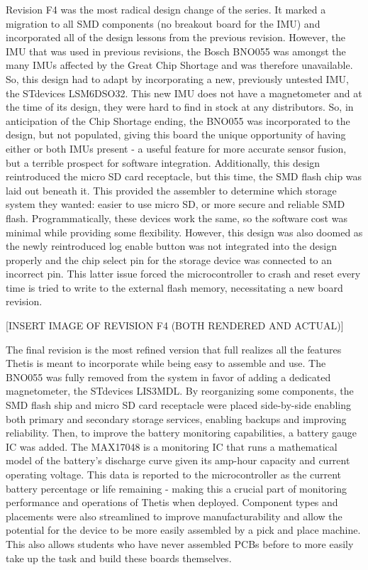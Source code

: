 Revision F4 was the most radical design change of the series.
It marked a migration to all SMD components (no breakout board for the IMU) and incorporated all of the design lessons from the previous revision.
However, the IMU that was used in previous revisions, the Bosch BNO055 was amongst the many IMUs affected by the Great Chip Shortage and was therefore unavailable.
So, this design had to adapt by incorporating a new, previously untested IMU, the STdevices LSM6DSO32.
This new IMU does not have a magnetometer and at the time of its design, they were hard to find in stock at any distributors.
So, in anticipation of the Chip Shortage ending, the BNO055 was incorporated to the design, but not populated, giving this board the unique opportunity of having either or both IMUs present - a useful feature for more accurate sensor fusion, but a terrible prospect for software integration.
Additionally, this design reintroduced the micro SD card receptacle, but this time, the SMD flash chip was laid out beneath it.
This provided the assembler to determine which storage system they wanted: easier to use micro SD, or more secure and reliable SMD flash.
Programmatically, these devices work the same, so the software cost was minimal while providing some flexibility.
However, this design was also doomed as the newly reintroduced log enable button was not integrated into the design properly and the chip select pin for the storage device was connected to an incorrect pin.
This latter issue forced the microcontroller to crash and reset every time is tried to write to the external flash memory, necessitating a new board revision.

[INSERT IMAGE OF REVISION F4 (BOTH RENDERED AND ACTUAL)]

The final revision is the most refined version that full realizes all the features Thetis is meant to incorporate while being easy to assemble and use.
The BNO055 was fully removed from the system in favor of adding a dedicated magnetometer, the STdevices LIS3MDL.
By reorganizing some components, the SMD flash ship and micro SD card receptacle were placed side-by-side enabling both primary and secondary storage services, enabling backups and improving reliability.
Then, to improve the battery monitoring capabilities, a battery gauge IC was added.
The MAX17048 is a monitoring IC that runs a mathematical model of the battery's discharge curve given its amp-hour capacity and current operating voltage.
This data is reported to the microcontroller as the current battery percentage or life remaining - making this a crucial part of monitoring performance and operations of Thetis when deployed.
Component types and placements were also streamlined to improve manufacturability and allow the potential for the device to be more easily assembled by a pick and place machine.
This also allows students who have never assembled PCBs before to more easily take up the task and build these boards themselves.

